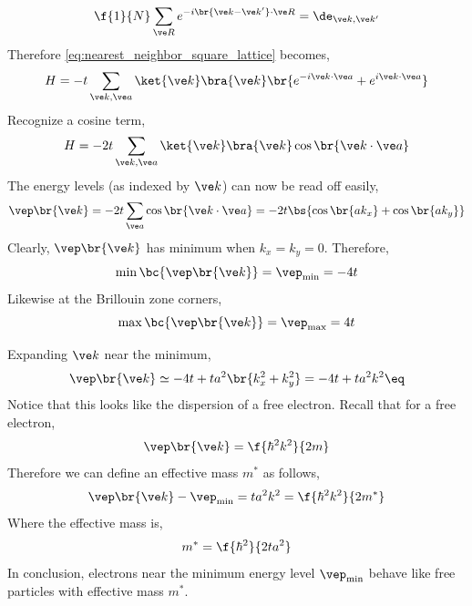 \documentclass{article}
\begin{document}
\[ \f{1}{N} \sum_{\ve R} e^{- i \br{\ve k - \ve k'} \cdot \ve R} = \de_{\ve k, \ve k'} \]
Therefore \cref{eq:nearest_neighbor_square_lattice} becomes,
\[ H = - t \sum_{\ve k, \ve a} \ket{\ve k} \bra{\ve k} \br{e^{- i\ve k \cdot \ve a} + e^{i\ve k \cdot \ve a}} \]
Recognize a cosine term,
\[ H = - 2t \sum_{\ve k, \ve a} \ket{\ve k} \bra{\ve k} \cos \br{\ve k \cdot \ve a} \]
The energy levels (as indexed by $\ve k$) can now be read off easily,
\[ \vep \br{\ve k} = -2 t \sum_{\ve a} \cos \br{\ve k \cdot \ve a} = - 2t \bs{ \cos \br{ ak_x} + \cos \br{ ak_y}} \]
Clearly, $\vep\br{\ve k}$ has minimum when $k_x = k_y = 0$. Therefore,
\[ \min\bc{\vep\br{\ve k}} = \vep_{\min} = - 4 t \]
Likewise at the Brillouin zone corners,
\[ \max\bc{\vep\br{\ve k}} = \vep_{\max} = 4 t \]
\begin{center}
\end{center}
Expanding $\ve k$ near the minimum,
\[ \vep\br{\ve k} \simeq -4t + t a^2 \br{k_x^2 + k_y^2} = -4t + ta^2 k^2 \eq \label{eq:minimum_k}\]
Notice that this looks like the dispersion of a free electron.
Recall that for a free electron,
\[ \vep \br{\ve k} = \f{\hbar^2 k^2}{2 m} \]
Therefore we can define an effective mass $m^{*}$ as follows,
\[ \vep \br{\ve k} - \vep_{\min} = ta^2 k^2 = \f{\hbar^2 k^2}{2 m^{*}} \]
Where the effective mass is,
\[ m^{*} = \f{\hbar^2}{2 t a^2} \]
In conclusion, electrons near the minimum energy level $\vep_{\min}$ behave like free particles with effective mass $m^{*}$. \\
\end{document}
